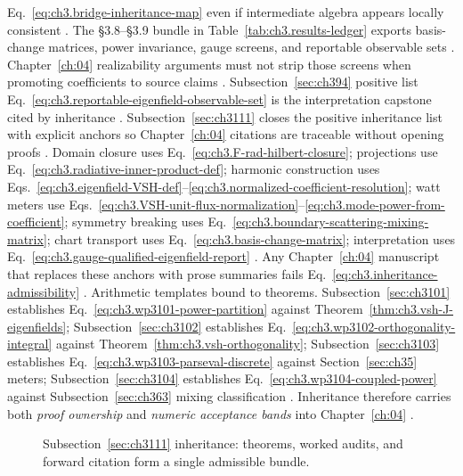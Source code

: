 Eq.~\eqref{eq:ch3.bridge-inheritance-map} even if intermediate algebra appears locally consistent \cite{devaney2004}.
The §3.8--§3.9 bundle in Table~\ref{tab:ch3.results-ledger} exports basis-change matrices, power invariance, gauge screens, and reportable observable sets
\cite{belinfante1940}. Chapter~\ref{ch:04} realizability arguments must not strip those screens when promoting coefficients to
source claims \cite{stratton1941}. Subsection~\ref{sec:ch394} positive list Eq.~\eqref{eq:ch3.reportable-eigenfield-observable-set}
is the interpretation capstone cited by inheritance \cite{hansen1988}.
Subsection~\ref{sec:ch3111} closes the positive inheritance list with explicit anchors so Chapter~\ref{ch:04} citations are traceable without opening proofs
\cite{stratton1941}. Domain closure uses Eq.~\eqref{eq:ch3.F-rad-hilbert-closure}; projections use Eq.~\eqref{eq:ch3.radiative-inner-product-def}; harmonic construction uses
Eqs.~\eqref{eq:ch3.eigenfield-VSH-def}--\eqref{eq:ch3.normalized-coefficient-resolution}; watt meters use Eqs.~\eqref{eq:ch3.VSH-unit-flux-normalization}--\eqref{eq:ch3.mode-power-from-coefficient}; symmetry breaking uses
Eq.~\eqref{eq:ch3.boundary-scattering-mixing-matrix}; chart transport uses Eq.~\eqref{eq:ch3.basis-change-matrix}; interpretation uses Eq.~\eqref{eq:ch3.gauge-qualified-eigenfield-report}
\cite{hansen1988}. Any Chapter~\ref{ch:04} manuscript that replaces these anchors with prose summaries fails Eq.~\eqref{eq:ch3.inheritance-admissibility}
\cite{harrington2001}.
Arithmetic templates bound to theorems. Subsection~\ref{sec:ch3101} establishes Eq.~\eqref{eq:ch3.wp3101-power-partition} against Theorem~\ref{thm:ch3.vsh-J-eigenfields}; Subsection~\ref{sec:ch3102} establishes Eq.~\eqref{eq:ch3.wp3102-orthogonality-integral} against Theorem~\ref{thm:ch3.vsh-orthogonality}; Subsection~\ref{sec:ch3103} establishes Eq.~\eqref{eq:ch3.wp3103-parseval-discrete} against Section~\ref{sec:ch35} meters; Subsection~\ref{sec:ch3104} establishes Eq.~\eqref{eq:ch3.wp3104-coupled-power} against Subsection~\ref{sec:ch363} mixing classification
\cite{hansen1988}. Inheritance therefore carries both \emph{proof ownership} and \emph{numeric acceptance bands} into Chapter~\ref{ch:04}
\cite{devaney2004}.
\begin{figure}[t]
\centering
{}
\caption{Subsection~\ref{sec:ch3111} inheritance: theorems, worked audits, and forward citation form a single admissible bundle.}
\label{fig:ch3.3111-inheritance-chain}
\end{figure}

